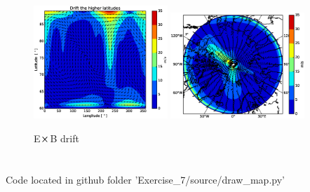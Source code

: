 \documentclass[x11names]{article}
\begin{document}
    \begin{figure}
      \centering
      \includegraphics[width = 0.45\textwidth]{vArrows}
      \includegraphics[width = 0.45\textwidth]{map_drift}
      \caption{E\(\cross\)B drift}
      \label{fig:drift}
    \end{figure}

  \appendix
  \section{}
  Code located in github folder 'Exercise\_7/source/draw\_map.py'
  
  
\end{document}
